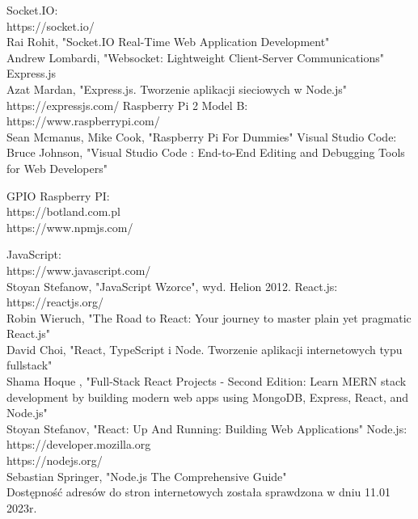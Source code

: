 \begin{thebibliography}{1}
 Socket.IO:
\\
https://socket.io/
\\
Rai Rohit, "Socket.IO Real-Time Web Application Development"
\\
Andrew Lombardi, "Websocket: Lightweight Client-Server Communications"
 Express.js
\\
Azat Mardan, "Express.js. Tworzenie aplikacji sieciowych w Node.js"
https://expressjs.com/
Raspberry Pi 2 Model B:
\\
https://www.raspberrypi.com/
\\
 Sean Mcmanus, Mike Cook, "Raspberry Pi For Dummies"
Visual Studio Code:
\\
Bruce Johnson, "Visual Studio Code : End-to-End Editing and Debugging Tools for Web Developers"

 GPIO Raspberry PI:
\\
https://botland.com.pl
\\
https://www.npmjs.com/

 JavaScript:
\\
https://www.javascript.com/
\\
Stoyan Stefanow, "JavaScript Wzorce", wyd. Helion 2012.
React.js:
\\
https://reactjs.org/
\\
Robin Wieruch, "The Road to React: Your journey to master plain yet pragmatic React.js"
\\
David Choi, "React, TypeScript i Node. Tworzenie aplikacji internetowych typu fullstack"
\\
Shama Hoque , "Full-Stack React Projects - Second Edition: Learn MERN stack development by building modern web apps using MongoDB, Express, React, and Node.js"
\\
Stoyan Stefanov, "React: Up And Running: Building Web Applications"
Node.js:
\\
https://developer.mozilla.org
\\
https://nodejs.org/
\\
Sebastian Springer, "Node.js The Comprehensive Guide"
\\

Dostępność adresów do stron internetowych została sprawdzona w dniu 11.01 2023r.

\end{thebibliography}


